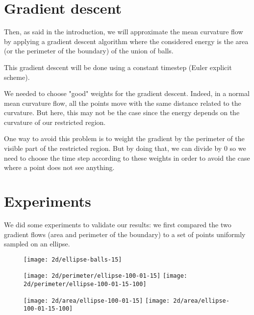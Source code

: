 \section{Gradient descent}

Then, as said in the introduction, we will approximate the mean curvature flow
by applying a gradient descent algorithm where the considered energy is the area
(or the perimeter of the boundary) of the union of balls.

This gradient descent will be done using a constant timestep (Euler explicit
scheme).

We needed to choose "good" weights for the gradient descent. Indeed, in a normal
mean curvature flow, all the points move with the same distance related to the
curvature. But here, this may not be the case since the energy depends on the
curvature of our restricted region.

One way to avoid this problem is to weight the gradient by the perimeter of the
visible part of the restricted region. But by doing that, we can divide by $ 0 $
so we need to choose the time step according to these weights in order to avoid
the case where a point does not see anything.


\section{Experiments}

We did some experiments to validate our results: we first compared the two
gradient flows (area and perimeter of the boundary) to a set of points uniformly
sampled on an ellipse.

\begin{figure}[H]
    \centering

    \texttt{[image: 2d/ellipse-balls-15]}

    \texttt{[image: 2d/perimeter/ellipse-100-01-15]}
    \texttt{[image: 2d/perimeter/ellipse-100-01-15-100]}
    \label{fig:ellipse_area_flow}

    \texttt{[image: 2d/area/ellipse-100-01-15]}
    \texttt{[image: 2d/area/ellipse-100-01-15-100]}
    \label{fig:ellipse_perimeter_flow}
\end{figure}

